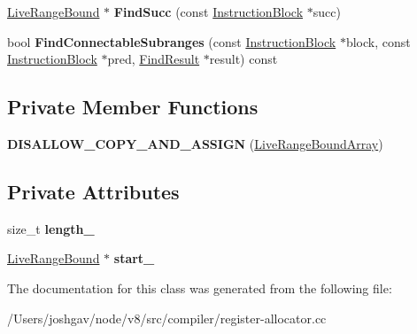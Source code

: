 \begin{DoxyCompactItemize}
\item 
\hyperlink{classv8_1_1internal_1_1compiler_1_1_live_range_bound}{Live\+Range\+Bound} $\ast$ {\bfseries Find\+Succ} (const \hyperlink{classv8_1_1internal_1_1compiler_1_1_instruction_block}{Instruction\+Block} $\ast$succ)\hypertarget{classv8_1_1internal_1_1compiler_1_1_live_range_bound_array_adf118fd29ec8eb9dd45f474f3e9fa156}{}\label{classv8_1_1internal_1_1compiler_1_1_live_range_bound_array_adf118fd29ec8eb9dd45f474f3e9fa156}

\item 
bool {\bfseries Find\+Connectable\+Subranges} (const \hyperlink{classv8_1_1internal_1_1compiler_1_1_instruction_block}{Instruction\+Block} $\ast$block, const \hyperlink{classv8_1_1internal_1_1compiler_1_1_instruction_block}{Instruction\+Block} $\ast$pred, \hyperlink{structv8_1_1internal_1_1compiler_1_1_find_result}{Find\+Result} $\ast$result) const \hypertarget{classv8_1_1internal_1_1compiler_1_1_live_range_bound_array_ae3fd31ee75de381a031ffd8a78f37d6a}{}\label{classv8_1_1internal_1_1compiler_1_1_live_range_bound_array_ae3fd31ee75de381a031ffd8a78f37d6a}

\end{DoxyCompactItemize}
\subsection*{Private Member Functions}
\begin{DoxyCompactItemize}
\item 
{\bfseries D\+I\+S\+A\+L\+L\+O\+W\+\_\+\+C\+O\+P\+Y\+\_\+\+A\+N\+D\+\_\+\+A\+S\+S\+I\+GN} (\hyperlink{classv8_1_1internal_1_1compiler_1_1_live_range_bound_array}{Live\+Range\+Bound\+Array})\hypertarget{classv8_1_1internal_1_1compiler_1_1_live_range_bound_array_af41a72d198caa1f6ff30cb2b218babf0}{}\label{classv8_1_1internal_1_1compiler_1_1_live_range_bound_array_af41a72d198caa1f6ff30cb2b218babf0}

\end{DoxyCompactItemize}
\subsection*{Private Attributes}
\begin{DoxyCompactItemize}
\item 
size\+\_\+t {\bfseries length\+\_\+}\hypertarget{classv8_1_1internal_1_1compiler_1_1_live_range_bound_array_a5a8099d1ebb58941dfe4d3e27e760258}{}\label{classv8_1_1internal_1_1compiler_1_1_live_range_bound_array_a5a8099d1ebb58941dfe4d3e27e760258}

\item 
\hyperlink{classv8_1_1internal_1_1compiler_1_1_live_range_bound}{Live\+Range\+Bound} $\ast$ {\bfseries start\+\_\+}\hypertarget{classv8_1_1internal_1_1compiler_1_1_live_range_bound_array_a59f2e676ffc06be79019a7e839016ba2}{}\label{classv8_1_1internal_1_1compiler_1_1_live_range_bound_array_a59f2e676ffc06be79019a7e839016ba2}

\end{DoxyCompactItemize}


The documentation for this class was generated from the following file\+:\begin{DoxyCompactItemize}
\item 
/\+Users/joshgav/node/v8/src/compiler/register-\/allocator.\+cc\end{DoxyCompactItemize}
